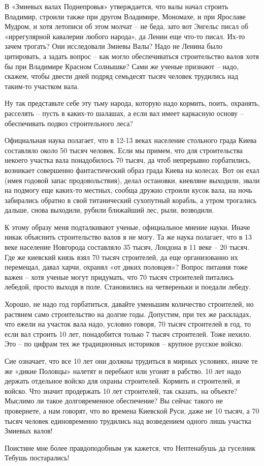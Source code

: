 В «Змиевых валах Поднепровья» утверждается, что валы начал строить Владимир, строили также при другом Владимире, Мономахе, и при Ярославе Мудром, и хотя летописи об этом молчат – не беда, зато вот Энгельс писал об «иррегулярной кавалерии любого народа», да Ленин еще что-то писал. Их-то зачем трогать? Они исследовали Змиевы Валы? Надо не Ленина было цитировать, а задать вопрос – как могло обеспечиваться строительство валов хотя бы при Владимире Красном Солнышке? Сами же ученые признают – надо, скажем, чтобы двести дней подряд семьдесят тысяч человек трудились над таким-то участком вала.

Ну так представьте себе эту тьму народа, которую надо кормить, поить, охранять, расселять – пусть в каких-то шалашах, а если вал имеет каркасную основу – обеспечивать подвоз строительного леса? 

Официальная наука полагает, что в 12-13 веках население стольного града Киева составляло около 50 тысяч человек. Если мы примем, что для строительства некоего участка вала понадобилось 70 тысяч, да чтоб непрерывно горбатились, возникает совершенно фантастический образ града Киева на колесах. Вот он ехал (имея годовой запас продовольствия), делал остановки, киевляне выходили, звали на подмогу еще каких-то местных, сообща дружно строили кусок вала, на ночь забирались обратно в свой титанический сухопутный корабль, а утром трогались дальше, снова выходили, рубили ближайший лес, рыли, возводили.

К этому образу меня подталкивают ученые, официальное мнение науки. Иначе никак объяснить строительство валов я не могу. Та же наука полагает, что в 13 веке население Новгорода составляло 35 тысяч, Лондона в 11 веке – 20 тысяч. Где же киевский князь взял 70 тысяч строителей, да еще организованно их перемещал, давал харчи, охранял «от диких половцев»? Вопрос питания тоже важен – хотя ученые могут придумать, что 70 тысяч строителей питались лебедой, просто выходя в поле. Становились на четвереньки и поедали лебеду.

Хорошо, не надо год горбатиться, давайте уменьшим количество строителей, но растянем само строительство на долгие годы. Допустим, при тех же раскладах, что ежели на участок вала надо, условно говоря, 70 тысяч строителей в год, то если вал строить 10 лет, понадобится только 7 тысяч строителей. Тоже нехило. Это – по цифрам тех же традиционных историков – крупное русское войско.

Сие означает, что все 10 лет они должны трудиться в мирных условиях, иначе те же «дикие Половцы» налетят и перебьют или угонят в рабство. 10 лет надо держать отдельное войско для охраны строителей. Кормить и строителей, и войско. Что значит продержать 10 лет строителей, так сказать, на объекте? Мыслимо ли такое долговременное обеспечение? Вы сейчас такого не провернете, а нам говорят, что во времена Киевской Руси, даже не 10 тысяч, а 70 тысяч человек единовременно трудились над возведением одного лишь участка Змиевых валов!

Поистине мне более правдоподобным уж кажется, что Неп­тенабушь да гуселник Тебушь постарались!

